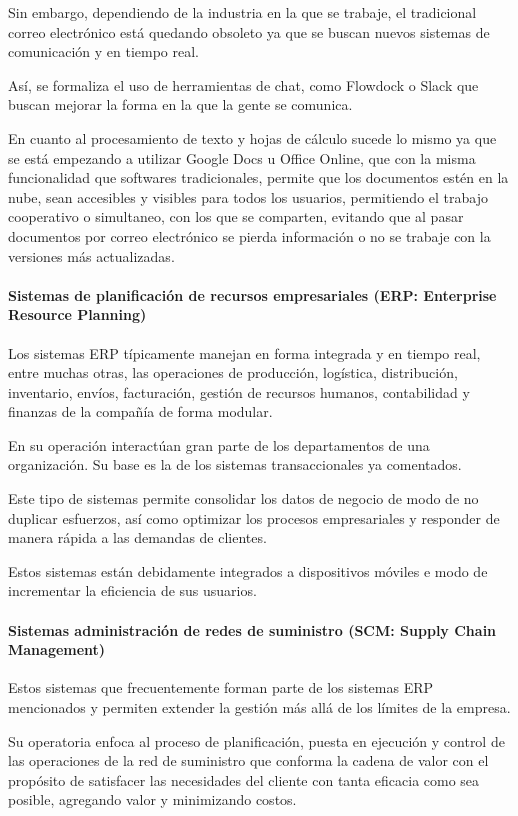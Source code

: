 \documentclass[a4paper, 12pt]{article}
\begin{document}
Sin embargo, dependiendo de la industria en la que se trabaje, el tradicional correo electrónico está quedando obsoleto ya que se buscan nuevos sistemas de comunicación y en tiempo real.

Así, se formaliza el uso de herramientas de chat, como Flowdock o Slack que buscan mejorar la forma en la que la gente se comunica.

En cuanto al procesamiento de texto y hojas de cálculo sucede lo mismo ya que se está empezando a utilizar Google Docs u Office Online, que con la misma funcionalidad que softwares tradicionales, permite que los documentos estén en la nube, sean accesibles y visibles para todos los usuarios, permitiendo el trabajo cooperativo o simultaneo,  con los que se comparten, evitando que al pasar documentos por correo electrónico se pierda información o no se trabaje con la versiones más actualizadas.

\paragraph{Sistemas de planificación de recursos empresariales (ERP: Enterprise Resource Planning)}

Los sistemas ERP típicamente manejan en forma integrada y en tiempo real, entre muchas otras, las operaciones de producción, logística, distribución, inventario, envíos, facturación, gestión de recursos humanos, contabilidad y finanzas de la compañía de forma modular. 

En su operación interactúan gran parte de los departamentos de una organización. Su base es la de los sistemas transaccionales ya comentados.

Este tipo de sistemas permite consolidar los datos de negocio de modo de no duplicar esfuerzos, así como optimizar los procesos empresariales y responder de manera rápida a las demandas de clientes.

Estos sistemas están debidamente integrados a dispositivos móviles e modo de incrementar la eficiencia de sus usuarios.

\paragraph{Sistemas   administración   de   redes   de suministro (SCM: Supply Chain Management)}
Estos sistemas que frecuentemente forman parte de los sistemas ERP mencionados y permiten extender la gestión más allá de los límites de la empresa. 

Su operatoria enfoca al proceso de planificación, puesta en ejecución y control de las operaciones de la red de suministro que conforma la cadena de valor con el propósito de satisfacer las necesidades del cliente con tanta eficacia como sea posible, agregando valor y minimizando costos.
\end{document}
